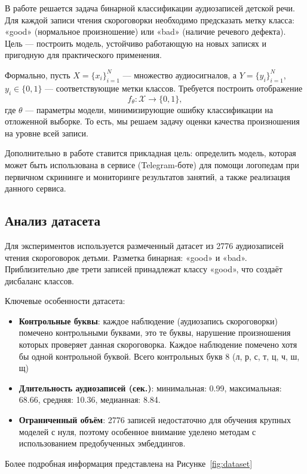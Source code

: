 \documentclass[a4paper,14pt]{extarticle}
\begin{document}
В работе решается задача бинарной классификации аудиозаписей детской речи. Для каждой записи чтения скороговорки необходимо предсказать метку класса: «good» (нормальное
произношение) или «bad» (наличие речевого дефекта). Цель --- построить модель, устойчиво работающую на новых записях и пригодную для практического применения.

Формально, пусть $X=\{x_i\}_{i=1}^{N}$ --- множество аудиосигналов, а
$Y=\{y_i\}_{i=1}^{N}$, $y_i \in \{0,1\}$ --- соответствующие метки классов. Требуется построить отображение
\[
f_\theta : \mathcal{X} \rightarrow \{0,1\},
\]
где $\theta$ --- параметры модели, минимизирующие ошибку классификации на отложенной выборке. То есть, мы решаем задачу оценки качества произношения на уровне всей записи.

Дополнительно в работе ставится прикладная цель: определить модель, которая может быть использована в сервисе (Telegram-боте) для помощи логопедам при первичном
скрининге и мониторинге результатов занятий, а также реализация данного сервиса.

\subsection{Анализ датасета}

Для экспериментов используется размеченный датасет из 2776 аудиозаписей чтения
скороговорок детьми. Разметка бинарная: «good» и «bad». Приблизительно две трети записей принадлежат классу «good», что создаёт дисбаланс классов.

Ключевые особенности датасета:
\begin{itemize}
    \item \textbf{Контрольные буквы}: каждое наблюдение (аудиозапись скороговорки) помечено контрольными буквами, это те буквы, нарушение произношения которых проверяет данная скороговорка. Каждое наблюдение помечено хотя бы одной контрольной буквой. Всего контрольных букв 8 (л, р, с, т, ц, ч, ш, щ)
    \item \textbf{Длительность аудиозаписей (сек.)}: минимальная: 0.99, максимальная: 68.66, средняя: 10.36, медианная: 8.84.
    \item \textbf{Ограниченный объём}: 2776 записей недостаточно для обучения крупных моделей с нуля, поэтому особенное внимание уделено методам с использованием предобученных эмбеддингов.
\end{itemize}

Более подробная информация представлена на Рисунке~\ref{fig:dataset}
\end{document}

